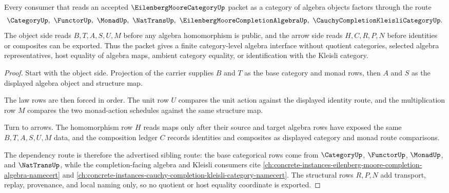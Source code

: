 \begin{theorem}
\label{thm:eilenberg-moore-category-algebra-route}
Every consumer that reads an accepted $\EilenbergMooreCategoryUp$ packet as a category of algebra objects factors through the route
$$
\CategoryUp,\ \FunctorUp,\ \MonadUp,\ \NatTransUp,\ \EilenbergMooreCompletionAlgebraUp,\ \CauchyCompletionKleisliCategoryUp .
$$
The object side reads $B,T,A,S,U,M$ before any algebra homomorphism is public, and the arrow side reads $H,C,R,P,N$ before identities or composites can be exported. Thus the packet gives a finite category-level algebra interface without quotient categories, selected algebra representatives, host equality of algebra maps, ambient category equality, or identification with the Kleisli category.
\end{theorem}
\begin{proof}
Start with the object side. Projection of the carrier supplies $B$ and $T$ as the base category and monad rows, then $A$ and $S$ as the displayed algebra object and structure map.

The law rows are then forced in order. The unit row $U$ compares the unit action against the displayed identity route, and the multiplication row $M$ compares the two monad-action schedules against the same structure map.

Turn to arrows. The homomorphism row $H$ reads maps only after their source and target algebra rows have exposed the same $B,T,A,S,U,M$ data, and the composition ledger $C$ records identities and composites as displayed category and monad route comparisons.

The dependency route is therefore the advertised sibling route: the base categorical rows come from $\CategoryUp$, $\FunctorUp$, $\MonadUp$, and $\NatTransUp$, while the completion-facing algebra and Kleisli consumers cite \autoref{ch:concrete-instances-eilenberg-moore-completion-algebra-namecert} and \autoref{ch:concrete-instances-cauchy-completion-kleisli-category-namecert}. The structural rows $R,P,N$ add transport, replay, provenance, and local naming only, so no quotient or host equality coordinate is exported.
\end{proof}


